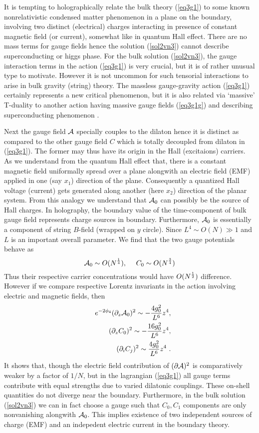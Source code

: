 \documentclass[12pt]{article}
\def\be{\begin{equation}} \def\ee{\end{equation}}
\def\bea{\begin{eqnarray}} \def\eea{\end{eqnarray}} \def\ba{\begin{array}}
\newcommand{\eqn}[1]{(\ref{#1})}
\def\br{\nonumber\\}
\begin{document}
It is tempting to holographically 
relate the bulk  theory \eqn{eq3g1} to  some known nonrelativistic 
condensed matter phenomenon in a plane on the boundary,
 involving two distinct  (electrical) charges interacting
in presence of  constant magnetic field (or current), somewhat like in  quantum
Hall effect. There are no mass terms for  gauge fields hence 
the solution \eqn{sol2vn3} cannot
describe  superconducting or higgs phase. For the  bulk solution 
\eqn{sol2vn3}, 
the gauge interaction  terms in the action \eqn{eq3g1} is very crucial, but
it is of rather unusual type to motivate. However it is not uncommon
for such tensorial interactions to arise in bulk gravity (string) theory. 
The massless gauge-gravity
action  \eqn{eq3g1} certainly  represents a new critical phenomenon, 
but it is also related via `massive' T-duality to another action having 
 massive gauge fields  \eqn{eq3g1g} and describing
 superconducting phenomenon \cite{son, Hartnoll:2008kx}. 

Next the gauge field ${\cal{A}}$ specially  couples to the  dilaton 
hence it is  distinct as compared to the other gauge field $C$
 which is totally decoupled from
dilaton in  \eqn{eq3g1}. The former may thus have its 
origin in the Hall (excitaions) carriers.
As we understand from the quantum Hall effect that, 
there is a constant magnetic field uniformally spread over a  plane 
alongwith an electric field (EMF)  applied in one (say $x_1$) 
direction of the plane. 
Consequently a quantized Hall voltage (current) gets  
generated along another (here $x_2$) direction of the  planar system. 
From this analogy we understand that ${\cal{A}}_0$ can possibly
be the source of   Hall 
charges. In holography,  the boundary value of the time-component 
of bulk gauge field  represents 
charge sources in boundary. Furthermore,  ${\cal{A}}_0$ is
 essentially  a component of string $B$-field (wrapped on $y$ circle). 
Since $L^4\sim O(N)\gg 1$ and $L$  is an important overall parameter. We 
 find that the two gauge potentials  behave as
\be
{\cal A}_0\sim O(N^{1\over 4}), ~~~~ C_0\sim O(N^{3\over 4})\ee
Thus their respective carrier concentrations would  have $O(N^{1\over 2})$ 
difference. However
if we compare respective  Lorentz invariants in the action involving
 electric and magnetic fields, then
\bea
&&e^{-2\phi_4}(\partial_z{\cal A}_0)^2 \sim -{4g_0^2\over L^6}z^4 ,\br
&&(\partial_z{ C}_0)^2\sim -{16 g_0^2 \over L^6 } z^4 ,\br
&&(\partial_i{ C}_j)^2\sim {4g_0^2 \over L^6} z^4 \ .
\eea
It shows that, though the electric field contribution of 
$(\partial{\cal{A}})^2$ is comparatively weaker by a factor 
of $1/N$, but in the lagrangian \eqn{eq3g1} all gauge terms contribute
with equal strengths due to  varied dilatonic couplings. These
on-shell quantities do not diverge near the boundary.
Furthermore, in the bulk solution \eqn{sol2vn3} we can in fact choose a gauge
such that $C_0, C_1$ components are only nonvanishing alongwith ${\cal{A}}_0$. 
This implies existence of two  independent 
sources of charge (EMF) and an indepedent
electric current in the boundary theory.
\end{document}
